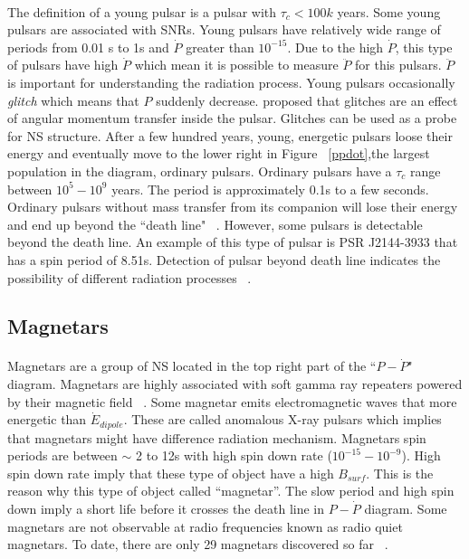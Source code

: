 \documentclass[thesis_msc.tex]{subfiles}
\begin{document}
\paragraph{} The definition of a young pulsar is a pulsar with $\tau_c < 100k$ years. Some young pulsars are associated with SNRs. Young pulsars have relatively wide range of periods from 0.01 s to 1s and $\dot{P}$ greater than $10^{-15}$. Due to the high $\dot{P}$, this type of pulsars have high $\dot{P}$  which mean it is possible to measure $\ddot{P}$ for this pulsars. 
$\ddot{P}$  is important for understanding the radiation process. Young pulsars occasionally \textit{glitch} which means that $P$ suddenly decrease. \cite{link1992pulsar} proposed that glitches are an effect of angular momentum transfer inside the pulsar. Glitches can be used as a probe for NS structure. After a few hundred years, young, energetic pulsars loose their energy and eventually move to the lower right in Figure ~\ref{ppdot},the largest population in the diagram, ordinary pulsars. Ordinary pulsars have a $\tau_c$ range between $10^5 - 10^9$ years. The period is approximately 0.1s to a few seconds. Ordinary pulsars without mass transfer from its companion will lose their energy and end up beyond the  ``death line" ~\citep{chen1993pulsar}. However, %
some pulsars is detectable beyond the death line.  An example of this type of pulsar is PSR J2144-3933 that has a spin period of 8.51s. Detection of pulsar beyond death line indicates the possibility of different radiation processes ~\citep{zhang2000radio}.        


\subsection{Magnetars} \label{magnetar}

\paragraph{} Magnetars are a group of NS located in the top right part of the ``$P-\dot{P}$" diagram. Magnetars are highly associated with soft gamma ray repeaters powered by their magnetic field ~\citep{duncan1992formation}. Some magnetar emits electromagnetic waves that more energetic than $\dot{E}_{dipole}$. These are called anomalous X-ray pulsars which implies that magnetars might have difference radiation mechanism. Magnetars spin periods are between $\sim$ 2 to 12s with high spin down rate ($10^{-15}-10^{-9}$). High spin down rate imply that these type of object have a high $B_{surf}$. This is the reason why this type of object called ``magnetar''. The slow period and high spin down imply a short life before it crosses the death line in $P-\dot{P}$ diagram.  Some magnetars are not observable at radio frequencies known as radio quiet  magnetars. To date, there are only 29 magnetars discovered so far ~\citep{Olausen:2013bpa}.
\end{document}
